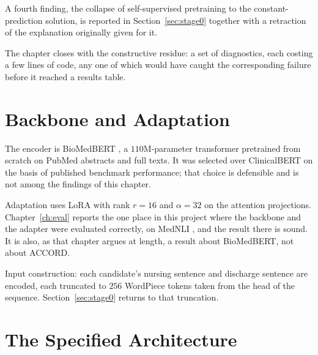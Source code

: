 A fourth finding, the collapse of self-supervised pretraining to the
constant-prediction solution, is reported in Section~\ref{sec:stage0} together
with a retraction of the explanation originally given for it.

The chapter closes with the constructive residue: a set of diagnostics, each
costing a few lines of code, any one of which would have caught the
corresponding failure before it reached a results table.

\section{Backbone and Adaptation}
\label{sec:backbone}

The encoder is BioMedBERT \citep{gu2021biomedbert}, a $110$M-parameter
transformer pretrained from scratch on PubMed abstracts and full texts. It was
selected over ClinicalBERT \citep{alsentzer2019clinicalbert} on the basis of
published benchmark performance; that choice is defensible and is not among the
findings of this chapter.

Adaptation uses LoRA \citep{hu2022lora} with rank $r = 16$ and
$\alpha = 32$ on the attention projections. Chapter~\ref{ch:eval} reports the
one place in this project where the backbone and the adapter were evaluated
correctly, on MedNLI \citep{romanov2018mednli}, and the result there is sound.
It is also, as that chapter argues at length, a result about BioMedBERT, not
about ACCORD.

Input construction: each candidate's nursing sentence and discharge sentence are
encoded, each truncated to $256$ WordPiece tokens taken from the head of the
sequence. Section~\ref{sec:stage0} returns to that truncation.

\section{The Specified Architecture}
\label{sec:spec}

